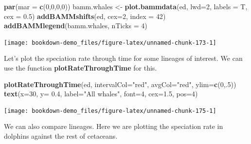 \documentclass[
]{book}
\newenvironment{Shaded}{\begin{snugshade}}{\end{snugshade}}
\newcommand{\DataTypeTok}[1]{\textcolor[rgb]{0.13,0.29,0.53}{#1}}
\newcommand{\DecValTok}[1]{\textcolor[rgb]{0.00,0.00,0.81}{#1}}
\newcommand{\FloatTok}[1]{\textcolor[rgb]{0.00,0.00,0.81}{#1}}
\newcommand{\KeywordTok}[1]{\textcolor[rgb]{0.13,0.29,0.53}{\textbf{#1}}}
\newcommand{\NormalTok}[1]{#1}
\newcommand{\StringTok}[1]{\textcolor[rgb]{0.31,0.60,0.02}{#1}}
\begin{document}
\begin{Shaded}
\begin{Highlighting}[]
\KeywordTok{par}\NormalTok{(}\DataTypeTok{mar =} \KeywordTok{c}\NormalTok{(}\DecValTok{0}\NormalTok{,}\DecValTok{0}\NormalTok{,}\DecValTok{0}\NormalTok{,}\DecValTok{0}\NormalTok{))}
\NormalTok{bamm.whales \textless{}{-}}\StringTok{ }\KeywordTok{plot.bammdata}\NormalTok{(ed, }\DataTypeTok{lwd=}\DecValTok{2}\NormalTok{, }\DataTypeTok{labels =}\NormalTok{ T, }\DataTypeTok{cex =} \FloatTok{0.5}\NormalTok{)}
\KeywordTok{addBAMMshifts}\NormalTok{(ed, }\DataTypeTok{cex=}\DecValTok{2}\NormalTok{, }\DataTypeTok{index =} \DecValTok{42}\NormalTok{)}
\KeywordTok{addBAMMlegend}\NormalTok{(bamm.whales, }\DataTypeTok{nTicks =} \DecValTok{4}\NormalTok{)}
\end{Highlighting}
\end{Shaded}

\begin{center}\texttt{[image: bookdown-demo\_files/figure-latex/unnamed-chunk-173-1]} \end{center}

Let's plot the speciation rate through time for some lineages of interest. We can use the function \textbf{plotRateThroughTime} for this.

\begin{Shaded}
\begin{Highlighting}[]
\KeywordTok{plotRateThroughTime}\NormalTok{(ed, }\DataTypeTok{intervalCol=}\StringTok{"red"}\NormalTok{, }\DataTypeTok{avgCol=}\StringTok{"red"}\NormalTok{, }\DataTypeTok{ylim=}\KeywordTok{c}\NormalTok{(}\DecValTok{0}\NormalTok{,.}\DecValTok{5}\NormalTok{))}
\KeywordTok{text}\NormalTok{(}\DataTypeTok{x=}\DecValTok{30}\NormalTok{, }\DataTypeTok{y=} \FloatTok{0.4}\NormalTok{, }\DataTypeTok{label=}\StringTok{"All whales"}\NormalTok{, }\DataTypeTok{font=}\DecValTok{4}\NormalTok{, }\DataTypeTok{cex=}\FloatTok{1.5}\NormalTok{, }\DataTypeTok{pos=}\DecValTok{4}\NormalTok{)}
\end{Highlighting}
\end{Shaded}

\begin{center}\texttt{[image: bookdown-demo\_files/figure-latex/unnamed-chunk-175-1]} \end{center}

We can also compare lineages. Here we are plotting the speciation rate in dolphins against the rest of cetaceans.
\end{document}
